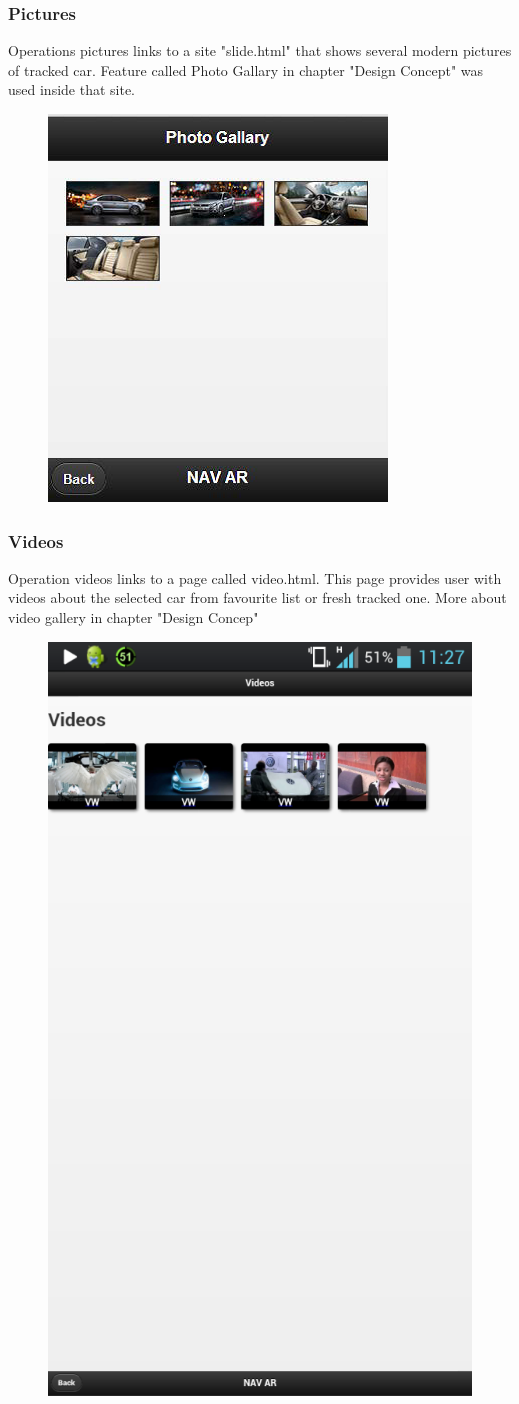 \subsubsection{Pictures}
Operations pictures links to a site "slide.html" that shows several modern pictures of tracked car. Feature called Photo Gallary in chapter "Design Concept" was used inside that site.
\\
\begin{figure}[H]
\centering
\includegraphics[width=0.5\linewidth]{graphics/chapter4/7}
\caption{}
\label{fig:8}
\end{figure}
\newpage

\subsubsection{Videos}
Operation videos links to a page called video.html. This page provides user with videos about the selected car from favourite list or fresh tracked one. More about video gallery in chapter "Design Concep"
\\
\begin{figure}[H]
\centering
\includegraphics[width=0.5\linewidth]{graphics/chapter4/8}
\caption{}
\label{fig:9}
\end{figure}
\newpage

